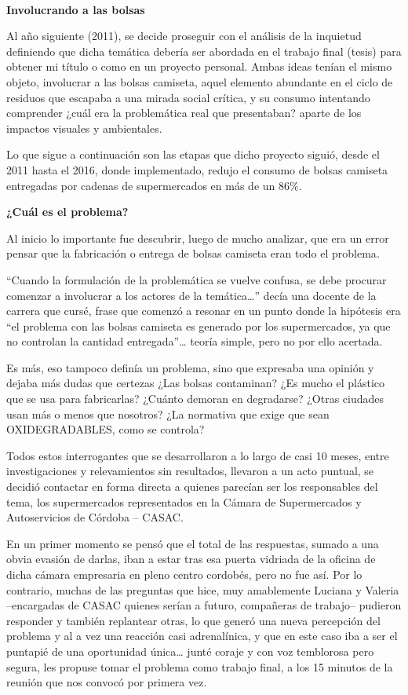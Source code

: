 \begin{fullwidth}
~

\textbf{Involucrando a las bolsas}

Al año siguiente (2011), se decide proseguir con el análisis de la
inquietud definiendo que dicha temática debería ser abordada en el
trabajo final (tesis) para obtener mi título o como en un proyecto
personal. Ambas ideas tenían el mismo objeto, involucrar a las bolsas
camiseta, aquel elemento abundante en el ciclo de residuos que escapaba
a una mirada social crítica, y su consumo intentando comprender ¿cuál
era la problemática real que presentaban? aparte de los impactos
visuales y ambientales.

Lo que sigue a continuación son las etapas que dicho proyecto siguió,
desde el 2011 hasta el 2016, donde implementado, redujo el consumo de
bolsas camiseta entregadas por cadenas de supermercados en más de un
86\%.

\textbf{¿Cuál es el problema?}

Al inicio lo importante fue descubrir, luego de mucho analizar, que era
un error pensar que la fabricación o entrega de bolsas camiseta eran
todo el problema\emph{.}

``Cuando la formulación de la problemática se vuelve confusa, se debe
procurar comenzar a involucrar a los actores de la temática\ldots{}''
decía una docente de la carrera que cursé, frase que comenzó a resonar
en un punto donde la hipótesis era ``el problema con las bolsas camiseta
es generado por los supermercados, ya que no controlan la cantidad
entregada''\ldots{} teoría simple, pero no por ello acertada.

Es más, eso tampoco definía un problema, sino que expresaba una opinión
y dejaba más dudas que certezas ¿Las bolsas contaminan? ¿Es mucho el
plástico que se usa para fabricarlas? ¿Cuánto demoran en degradarse?
¿Otras ciudades usan más o menos que nosotros? ¿La normativa que exige
que sean OXIDEGRADABLES, como se controla?

Todos estos interrogantes que se desarrollaron a lo largo de casi 10
meses, entre investigaciones y relevamientos sin resultados, llevaron a
un acto puntual, se decidió contactar en forma directa a quienes
parecían ser los responsables del tema, los supermercados representados
en la Cámara de Supermercados y Autoservicios de Córdoba -- CASAC.

En un primer momento se pensó que el total de las respuestas, sumado a
una obvia evasión de darlas, iban a estar tras esa puerta vidriada de la
oficina de dicha cámara empresaria en pleno centro cordobés, pero no fue
así. Por lo contrario, muchas de las preguntas que hice, muy amablemente
Luciana y Valeria --encargadas de CASAC quienes serían a futuro,
compañeras de trabajo-- pudieron responder y también replantear otras,
lo que generó una nueva percepción del problema y al a vez una reacción
casi adrenalínica, y que en este caso iba a ser el puntapié de una
oportunidad única\ldots{} junté coraje y con voz temblorosa pero segura,
les propuse tomar el problema como trabajo final, a los 15 minutos de la
reunión que nos convocó por primera vez.


\end{fullwidth}
